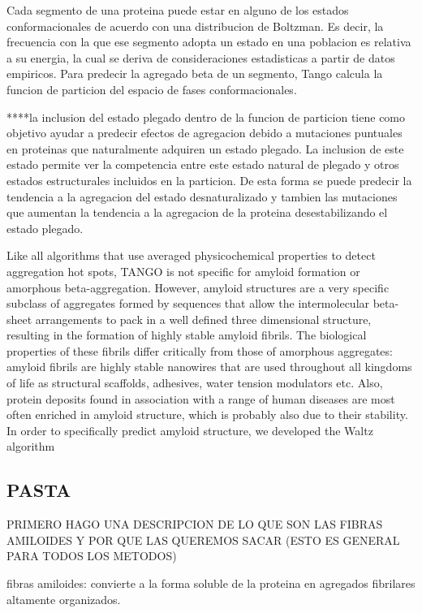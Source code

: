Cada segmento de una proteina puede estar en alguno de los estados conformacionales de acuerdo con una distribucion de Boltzman. Es decir, la frecuencia con la que ese segmento adopta un estado en una poblacion es relativa a su energia, la cual se deriva de consideraciones estadisticas a partir de datos empiricos.  
Para predecir la agregado beta de un segmento, Tango calcula la funcion de particion del espacio de fases conformacionales.


****la inclusion del estado plegado dentro de la funcion de particion tiene como objetivo ayudar a predecir efectos de agregacion debido a mutaciones puntuales en proteinas que naturalmente adquiren un estado plegado. La inclusion de este estado permite ver la competencia entre este estado natural de plegado y otros estados estructurales incluidos en la particion. De esta forma se puede predecir la tendencia a la agregacion del estado desnaturalizado y tambien las mutaciones que aumentan la tendencia a la agregacion de la proteina desestabilizando el estado plegado.


Like all algorithms that use averaged physicochemical properties to detect aggregation hot spots, TANGO is not specific for amyloid formation or amorphous beta-aggregation. However, amyloid structures are a very specific subclass of aggregates formed by sequences that allow the intermolecular beta-sheet arrangements to pack in a well defined three dimensional structure, resulting in the formation of highly stable amyloid fibrils. The biological properties of these fibrils differ critically from those of amorphous aggregates: amyloid fibrils are highly stable nanowires that are used throughout all kingdoms of life as structural scaffolds, adhesives, water tension modulators etc. Also, protein deposits found in association with a range of human diseases are most often enriched in amyloid structure, which is probably also due to their stability. In order to specifically predict amyloid structure, we developed the Waltz algorithm





\subsection{PASTA}
PRIMERO HAGO UNA DESCRIPCION DE LO QUE SON LAS FIBRAS AMILOIDES Y POR QUE LAS QUEREMOS SACAR (ESTO ES GENERAL PARA TODOS LOS METODOS)

fibras amiloides: convierte a la forma soluble de la proteina en agregados fibrilares altamente organizados.

